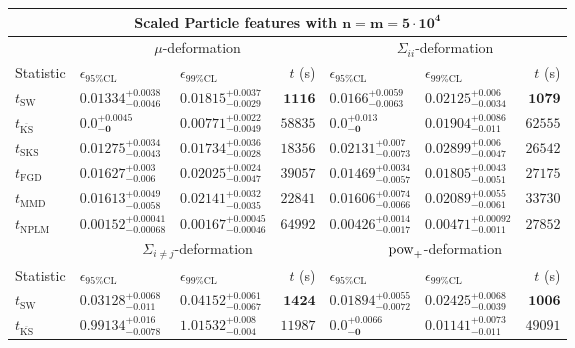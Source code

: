 \begin{tabular}{l|llr|llr}
	\toprule
	\multicolumn{7}{c}{{\bf Scaled Particle features with $\mathbf{n=m=5\cdot 10^{4}}$}} \\
	\toprule
	\multicolumn{1}{c}{} & \multicolumn{3}{c}{$\mu$-deformation} & \multicolumn{3}{c}{$\Sigma_{ii}$-deformation} \\
	Statistic & $\epsilon_{95\%\mathrm{CL}}$ & $\epsilon_{99\%\mathrm    {CL}}$ & $t$ (s) & $\epsilon_{95\%\mathrm{CL}}$ & $\epsilon_{99\%\mathrm{CL}}$ & $t$ (s) \\
	\midrule
	$t_{\mathrm{SW}}$ & $0.01334_{-0.0046}^{+0.0038}$ & $0.01815_{-0.0029}^{+0.0037}$ & ${\mathbf{1116}}$ & $0.0166_{-0.0063}^{+0.0059}$ & $0.02125_{-0.0034}^{+0.006}$ & ${\mathbf{1079}}$ \\
	$t_{\overline{\mathrm{KS}}}$ & ${\mathbf{0.0_{-0}^{+0.0045}}}$ & ${\mathbf{0.00771_{-0.0049}^{+0.0022}}}$ & $58835$ & ${\mathbf{0.0_{-0}^{+0.013}}}$ & $0.01904_{-0.011}^{+0.0086}$ & $62555$ \\
	$t_{\mathrm{SKS}}$ & $0.01275_{-0.0043}^{+0.0034}$ & $0.01734_{-0.0028}^{+0.0036}$ & $18356$ & $0.02131_{-0.0073}^{+0.007}$ & $0.02899_{-0.0047}^{+0.006}$ & $26542$ \\
	$t_{\mathrm{FGD}}$ & $0.01627_{-0.006}^{+0.003}$ & $0.02025_{-0.0047}^{+0.0024}$ & $39057$ & $0.01469_{-0.0057}^{+0.0034}$ & ${\mathbf{0.01805_{-0.0051}^{+0.0043}}}$ & $27175$ \\
	$t_{\mathrm{MMD}}$ & $0.01613_{-0.0058}^{+0.0049}$ & $0.02141_{-0.0035}^{+0.0032}$ & $22841$ & $0.01606_{-0.0066}^{+0.0074}$ & $0.02089_{-0.0061}^{+0.0055}$ & $33730$ \\
\rowcolor{red!35}	$t_{\mathrm{NPLM}}$ & $0.00152_{-0.00068}^{+0.00041}$ & $0.00167_{-0.00046}^{+0.00045}$ & $64992$ & $0.00426_{-0.0017}^{+0.0014}$ & $0.00471_{-0.0011}^{+0.00092}$ & $27852$ \\
	\toprule
	\multicolumn{1}{c}{} & \multicolumn{3}{c}{$\Sigma_{i\neq j}$-deformation} & \multicolumn{3}{c}{$\rm{pow}_{+}$-deformation} \\
Statistic & $\epsilon_{95\%\mathrm{CL}}$ & $\epsilon_{99\%\mathrm{CL}}$ & $t$ (s) & $\epsilon_{95\%\mathrm{CL}}$ & $\epsilon_{99\%\mathrm{CL}}$ & $t$ (s) \\
	\midrule
	$t_{\mathrm{SW}}$ & $0.03128_{-0.011}^{+0.0068}$ & $0.04152_{-0.0067}^{+0.0061}$ & ${\mathbf{1424}}$ & $0.01894_{-0.0072}^{+0.0055}$ & $0.02425_{-0.0039}^{+0.0068}$ & ${\mathbf{1006}}$ \\
	$t_{\overline{\mathrm{KS}}}$ & $0.99134_{-0.0078}^{+0.016}$ & $1.01532_{-0.004}^{+0.008}$ & $11987$ & ${\mathbf{0.0_{-0}^{+0.0066}}}$ & ${\mathbf{0.01141_{-0.011}^{+0.0073}}}$ & $49091$ \\

\end{tabular}
